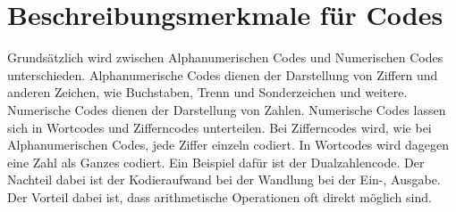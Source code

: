 \section{Beschreibungsmerkmale für Codes}
Grundsätzlich wird zwischen Alphanumerischen Codes und Numerischen Codes unterschieden. Alphanumerische Codes dienen der Darstellung von Ziffern und anderen Zeichen, wie Buchstaben, Trenn und Sonderzeichen und weitere. Numerische Codes dienen der Darstellung von Zahlen. Numerische Codes lassen sich in Wortcodes und Zifferncodes unterteilen. Bei Zifferncodes wird, wie bei Alphanumerischen Codes, jede Ziffer einzeln codiert. In Wortcodes wird dagegen eine Zahl als Ganzes codiert. Ein Beispiel dafür ist der Dualzahlencode. Der Nachteil dabei ist der Kodieraufwand bei der Wandlung bei der Ein-, Ausgabe. Der Vorteil dabei ist, dass arithmetische Operationen oft direkt möglich sind.

